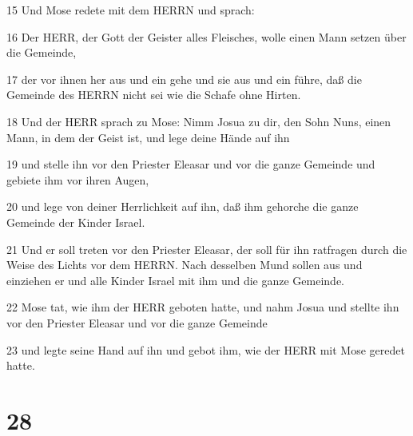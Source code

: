 \par 15 Und Mose redete mit dem HERRN und sprach:
\par 16 Der HERR, der Gott der Geister alles Fleisches, wolle einen Mann setzen über die Gemeinde,
\par 17 der vor ihnen her aus und ein gehe und sie aus und ein führe, daß die Gemeinde des HERRN nicht sei wie die Schafe ohne Hirten.
\par 18 Und der HERR sprach zu Mose: Nimm Josua zu dir, den Sohn Nuns, einen Mann, in dem der Geist ist, und lege deine Hände auf ihn
\par 19 und stelle ihn vor den Priester Eleasar und vor die ganze Gemeinde und gebiete ihm vor ihren Augen,
\par 20 und lege von deiner Herrlichkeit auf ihn, daß ihm gehorche die ganze Gemeinde der Kinder Israel.
\par 21 Und er soll treten vor den Priester Eleasar, der soll für ihn ratfragen durch die Weise des Lichts vor dem HERRN. Nach desselben Mund sollen aus und einziehen er und alle Kinder Israel mit ihm und die ganze Gemeinde.
\par 22 Mose tat, wie ihm der HERR geboten hatte, und nahm Josua und stellte ihn vor den Priester Eleasar und vor die ganze Gemeinde
\par 23 und legte seine Hand auf ihn und gebot ihm, wie der HERR mit Mose geredet hatte.

\chapter{28}

